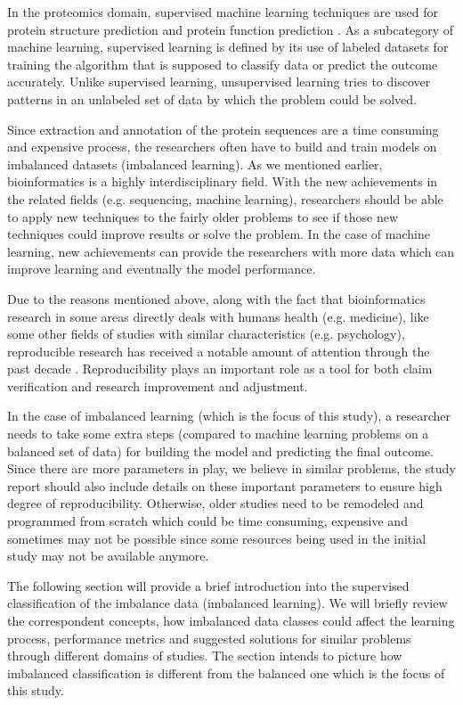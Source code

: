 In the proteomics domain, supervised machine learning techniques are used for protein structure prediction and protein 
function prediction \cite{lesh_complete_2003,mishra_prediction_2014}. As a subcategory of machine learning, supervised 
learning is defined by its use of labeled datasets for training the algorithm that is supposed to classify data or 
predict the outcome accurately. Unlike supervised learning, unsupervised learning tries to discover patterns in an unlabeled 
set of data by which the problem could be solved.

Since extraction and annotation of the protein sequences are a time consuming and expensive process, the researchers 
often have to build and train models on imbalanced datasets (imbalanced learning). As we mentioned earlier, bioinformatics 
is a highly interdisciplinary field. With the new achievements in the related fields (e.g. sequencing, machine learning), 
researchers should be able to apply new techniques to the fairly older problems to see if those new techniques could improve 
results or solve the problem. In the case of machine learning, new achievements can provide the researchers with more data 
which can improve learning and eventually the model performance.

Due to the reasons mentioned above, along with the fact that bioinformatics research in some areas directly deals 
with humans health (e.g. medicine), like some other fields of studies with similar characteristics (e.g. psychology), 
reproducible research has received a notable amount of attention through the past decade 
\cite{tatman_practical_2018,mcdermott_reproducibility_2019}. Reproducibility plays an important role as a 
tool for both claim verification and research improvement and adjustment. 

In the case of imbalanced learning (which is the focus of this study), a researcher needs to take some extra steps 
(compared to machine learning problems on a balanced set of data) for building the model and predicting the final outcome. 
Since there are more parameters in play, we believe in similar problems, the study report should also include details on 
these important parameters to ensure high degree of reproducibility. Otherwise, older studies need to be remodeled and 
programmed from scratch which could be time consuming, expensive and sometimes may not be possible since some resources 
being used in the initial study may not be available anymore.

The following section will provide a brief introduction into the supervised classification of the  imbalance data 
(imbalanced learning). We will briefly review the correspondent concepts, how imbalanced data classes could affect the 
learning process, performance metrics and suggested solutions for similar problems through different domains of studies. 
The section intends to picture how imbalanced classification is different from the balanced one which is the focus of this study.
